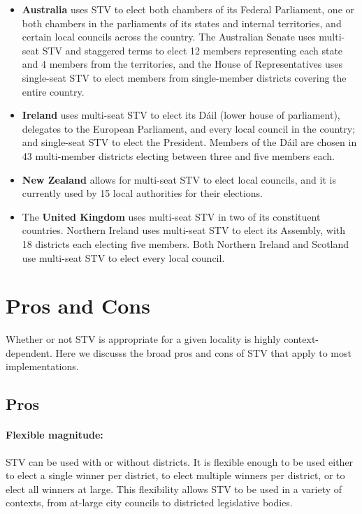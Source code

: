 \documentclass{amsart}
\theoremstyle{definition}
\begin{document}
\begin{itemize}
    \item \textbf{Australia} uses STV to elect both chambers of its Federal Parliament, one or both chambers in the parliaments of 
        its states and internal territories, and certain local councils across the country. The Australian Senate uses multi-seat STV 
        and staggered terms
        to elect 12 members representing each state and 4 members from the territories, and the House of 
        Representatives uses single-seat STV to elect members from single-member districts covering the entire country.
    \item \textbf{Ireland} uses multi-seat STV to elect its D\'ail (lower house of parliament), delegates to the 
        European Parliament, and every local council in the country; and single-seat STV to elect the President. 
        Members of the D\'ail are chosen in 43 multi-member districts electing between three and five members each. 
    \item \textbf{New Zealand} allows for multi-seat STV to elect local councils, and it is currently used by 
        15 local authorities for their elections. 
    \item The \textbf{United Kingdom} uses multi-seat STV in two of its constituent countries. Northern 
        Ireland uses multi-seat STV to elect its Assembly, with 18 districts each electing five members. Both 
        Northern Ireland and Scotland use multi-seat STV to elect every local council. 
\end{itemize}

\section{Pros and Cons}
Whether or not STV is appropriate for a given locality is highly context-dependent.
Here we discusss the broad pros and cons of STV that apply to most implementations.
\subsection{Pros}

\paragraph{{\bf{Flexible magnitude:}}}
 STV can be used with or without districts. It is flexible enough to be used 
    either to elect a single winner per district, to elect multiple winners per district,
    or to elect all winners at large. This flexibility allows STV to be used in a variety of contexts,
    from at-large city councils to districted legislative bodies.\\
\end{document}
